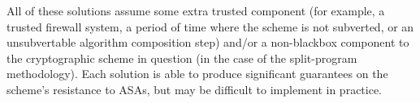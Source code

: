 All of these solutions assume some extra trusted component (for example, a trusted firewall system, a period of time where the scheme is not subverted, or an unsubvertable algorithm composition step) and/or a non-blackbox component to the cryptographic scheme in question (in the case of the split-program methodology). Each solution is able to produce significant guarantees on the scheme's resistance to ASAs, but may be difficult to implement in practice.

